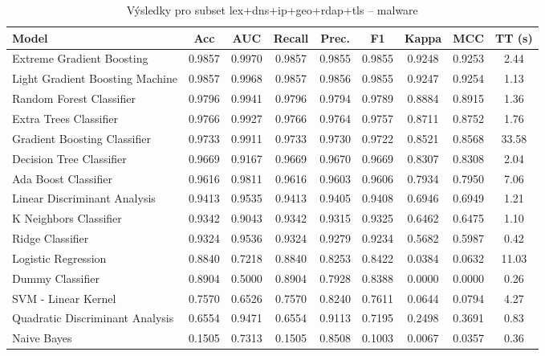 \begin{table}[H]
  \centering
  \small
  \caption{Výsledky pro subset lex+dns+ip+geo+rdap+tls – malware}
  \begin{tabular}{|l|c|c|c|c|c|c|c|c|}
    \hline
    \textbf{Model} & \textbf{Acc} & \textbf{AUC} & \textbf{Recall} & \textbf{Prec.} & \textbf{F1} & \textbf{Kappa} & \textbf{MCC} & \textbf{TT (s)} \\
    \hline
    Extreme Gradient Boosting & 0.9857 & 0.9970 & 0.9857 & 0.9855 & 0.9855 & 0.9248 & 0.9253 & 2.44 \\
    Light Gradient Boosting Machine & 0.9857 & 0.9968 & 0.9857 & 0.9856 & 0.9855 & 0.9247 & 0.9254 & 1.13 \\
    Random Forest Classifier & 0.9796 & 0.9941 & 0.9796 & 0.9794 & 0.9789 & 0.8884 & 0.8915 & 1.36 \\
    Extra Trees Classifier & 0.9766 & 0.9927 & 0.9766 & 0.9764 & 0.9757 & 0.8711 & 0.8752 & 1.76 \\
    Gradient Boosting Classifier & 0.9733 & 0.9911 & 0.9733 & 0.9730 & 0.9722 & 0.8521 & 0.8568 & 33.58 \\
    Decision Tree Classifier & 0.9669 & 0.9167 & 0.9669 & 0.9670 & 0.9669 & 0.8307 & 0.8308 & 2.04 \\
    Ada Boost Classifier & 0.9616 & 0.9811 & 0.9616 & 0.9603 & 0.9606 & 0.7934 & 0.7950 & 7.06 \\
    Linear Discriminant Analysis & 0.9413 & 0.9535 & 0.9413 & 0.9405 & 0.9408 & 0.6946 & 0.6949 & 1.21 \\
    K Neighbors Classifier & 0.9342 & 0.9043 & 0.9342 & 0.9315 & 0.9325 & 0.6462 & 0.6475 & 1.10 \\
    Ridge Classifier & 0.9324 & 0.9536 & 0.9324 & 0.9279 & 0.9234 & 0.5682 & 0.5987 & 0.42 \\
    Logistic Regression & 0.8840 & 0.7218 & 0.8840 & 0.8253 & 0.8422 & 0.0384 & 0.0632 & 11.03 \\
    Dummy Classifier & 0.8904 & 0.5000 & 0.8904 & 0.7928 & 0.8388 & 0.0000 & 0.0000 & 0.26 \\
    SVM - Linear Kernel & 0.7570 & 0.6526 & 0.7570 & 0.8240 & 0.7611 & 0.0644 & 0.0794 & 4.27 \\
    Quadratic Discriminant Analysis & 0.6554 & 0.9471 & 0.6554 & 0.9113 & 0.7195 & 0.2498 & 0.3691 & 0.83 \\
    Naive Bayes & 0.1505 & 0.7313 & 0.1505 & 0.8508 & 0.1003 & 0.0067 & 0.0357 & 0.36 \\
    \hline
  \end{tabular}
\end{table}
\vspace{0.5cm}


